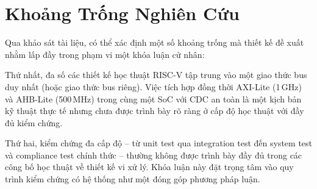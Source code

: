 \section{Khoảng Trống Nghiên Cứu}

Qua khảo sát tài liệu, có thể xác định một số khoảng trống mà thiết kế đề xuất nhằm lấp đầy trong phạm vi một khóa luận cử nhân:

Thứ nhất, đa số các thiết kế học thuật RISC-V tập trung vào một giao thức bus duy nhất (hoặc giao thức bus riêng). Việc tích hợp đồng thời AXI-Lite (1\,GHz) và AHB-Lite (500\,MHz) trong cùng một SoC với CDC an toàn là một kịch bản kỹ thuật thực tế nhưng chưa được trình bày rõ ràng ở cấp độ học thuật với đầy đủ kiểm chứng.

Thứ hai, kiểm chứng đa cấp độ -- từ unit test qua integration test đến system test và compliance test chính thức -- thường không được trình bày đầy đủ trong các công bố học thuật về thiết kế vi xử lý. Khóa luận này đặt trọng tâm vào quy trình kiểm chứng có hệ thống như một đóng góp phương pháp luận.
